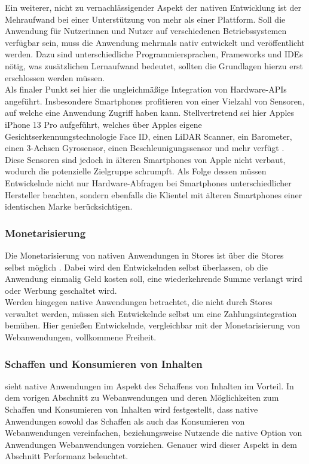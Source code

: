 \documentclass[a4paper]{scrartcl}
\begin{document}
Ein weiterer, nicht zu vernachlässigender Aspekt der nativen Entwicklung ist der Mehraufwand bei einer Unterstützung von mehr als einer Plattform. Soll die Anwendung für Nutzerinnen und Nutzer auf verschiedenen Betriebssystemen verfügbar sein, muss die Anwendung mehrmals nativ entwickelt und veröffentlicht werden. Dazu sind unterschiedliche Programmiersprachen, Frameworks und IDEs nötig, was zusätzlichen Lernaufwand bedeutet, sollten die Grundlagen hierzu erst erschlossen werden müssen. \\

Als finaler Punkt sei hier die ungleichmäßige Integration von Hardware-APIs angeführt. Insbesondere Smartphones profitieren von einer Vielzahl von Sensoren, auf welche eine Anwendung Zugriff haben kann. Stellvertretend sei hier Apples iPhone 13 Pro aufgeführt, welches über Apples eigene Gesichtserkennungstechnologie Face ID, einen LiDAR Scanner, ein Barometer, einen 3-Achsen Gyrosensor, einen Beschleunigungssensor und mehr verfügt \autocite{iPhone13_specs}. Diese Sensoren sind jedoch in älteren Smartphones von Apple nicht verbaut, wodurch die potenzielle Zielgruppe schrumpft. Als Folge dessen müssen Entwickelnde nicht nur Hardware-Abfragen bei Smartphones unterschiedlicher Hersteller beachten, sondern ebenfalls die Klientel mit älteren Smartphones einer identischen Marke berücksichtigen.


\subsubsection{Monetarisierung}

Die Monetarisierung von nativen Anwendungen in Stores ist über die Stores selbst möglich \autocite{Appstore_Connect}. Dabei wird den Entwickelnden selbst überlassen, ob die Anwendung einmalig Geld kosten soll, eine wiederkehrende Summe verlangt wird oder Werbung geschaltet wird. \\
Werden hingegen native Anwendungen betrachtet, die nicht durch Stores verwaltet werden, müssen sich Entwickelnde selbst um eine Zahlungsintegration bemühen. Hier genießen Entwickelnde, vergleichbar mit der Monetarisierung von Webanwendungen, vollkommene Freiheit.


\subsubsection{Schaffen und Konsumieren von Inhalten}

\textcite[28]{Jobe} sieht native Anwendungen im Aspekt des Schaffens von Inhalten im Vorteil. In dem vorigen Abschnitt zu Webanwendungen und deren Möglichkeiten zum Schaffen und Konsumieren von Inhalten wird festgestellt, dass native Anwendungen sowohl das Schaffen als auch das Konsumieren von Webanwendungen vereinfachen, beziehungsweise Nutzende die native Option von Anwendungen Webanwendungen vorziehen. Genauer wird dieser Aspekt in dem Abschnitt Performanz beleuchtet.
\end{document}
